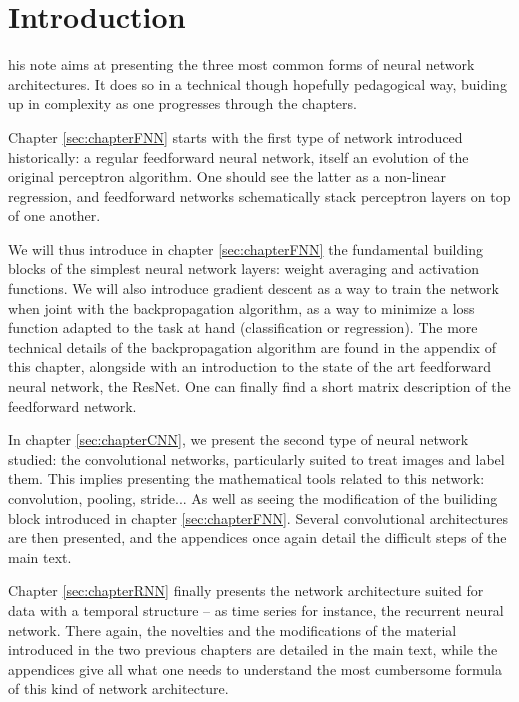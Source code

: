 \chapter{Introduction}

his note aims at presenting the three most common forms of neural network architectures. It does so in a technical though hopefully pedagogical way, buiding up in complexity as one progresses through the chapters. 

\vspace{0.2cm}

Chapter \ref{sec:chapterFNN} starts with the first type of network introduced historically: a regular feedforward neural network, itself an evolution of the original perceptron \cite{Rosenblatt58theperceptron:} algorithm. One should see the latter as a non-linear regression, and feedforward networks schematically stack perceptron layers on top of one another. 

\vspace{0.2cm}

We will thus introduce in chapter \ref{sec:chapterFNN} the fundamental building blocks of the simplest neural network layers: weight averaging and activation functions. We will also introduce gradient descent as a way to train the network when joint with the backpropagation algorithm, as a way to minimize a loss function adapted to the task at hand (classification or regression). The more technical details of the backpropagation algorithm are found in the appendix of this chapter, alongside with an introduction to the state of the art feedforward neural network, the ResNet. One can finally find a short matrix description of the feedforward network.

\vspace{0.2cm}

In chapter \ref{sec:chapterCNN}, we present the second type of neural network studied: the convolutional networks, particularly suited to treat images and label them. This implies presenting the mathematical tools related to this network: convolution, pooling, stride... As well as seeing the modification of the builiding block introduced in chapter \ref{sec:chapterFNN}. Several convolutional architectures are then presented, and the appendices once again detail the difficult steps of the main text.

\vspace{0.2cm}

Chapter \ref{sec:chapterRNN} finally presents the network architecture suited for data with a temporal structure -- as time series for instance, the recurrent neural network. There again, the novelties and the modifications of the material introduced in the two previous chapters are detailed in the main text, while the appendices give all what one needs to understand the most cumbersome formula of this kind of network architecture. 